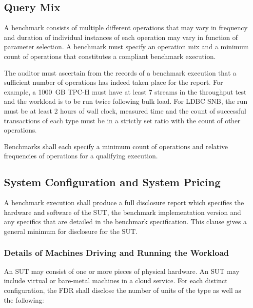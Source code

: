 \subsection{Query Mix}

A benchmark consists of multiple different operations that may vary in frequency and duration of individual
instances of each operation may vary in function of parameter selection. A benchmark must specify an operation
mix and a minimum count of operations that constitutes a compliant benchmark execution.

The auditor must ascertain from the records of a benchmark execution that a sufficient number of operations has indeed taken place for the report. For example, a 1000~GB \mbox{TPC-H} must have at least 7 streams in the throughput test and the workload is to be run twice following bulk load. For LDBC SNB, the run must be at least 2 hours of wall clock, measured time and the count of successful transactions of each type must be in a strictly set ratio with the count of other operations.

Benchmarks shall each specify a minimum count of operations and relative frequencies of operations for a qualifying
execution.

\subsection{System Configuration and System Pricing}
\label{sec:system-config}


A benchmark execution shall produce a full disclosure report which specifies the hardware and software of the SUT, the benchmark implementation version and any specifics that are detailed in the benchmark specification. This clause gives a general minimum for disclosure for the SUT.

\subsubsection{Details of Machines Driving and Running the Workload}
An SUT may consist of one or more pieces of physical hardware. An SUT may include virtual or bare-metal machines in a cloud service.
For each distinct configuration, the FDR shall disclose the number of units of the type as well as the following:

